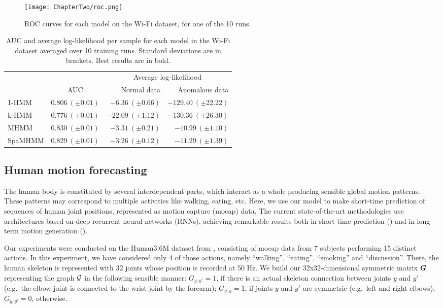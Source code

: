 \begin{figure}
    \centering
    \texttt{[image: ChapterTwo/roc.png]}
    \caption{ROC curves for each model on the Wi-Fi dataset, for one of the 10 runs.}
    \label{fig:spamhmm_wifi_roc}
\end{figure}

\begin{table}
    \centering
    \begin{tabular}{l|r|r r}
        \multicolumn{1}{c}{} & \multicolumn{1}{c}{} & \multicolumn{2}{|c}{Average log-likelihood} \\
        & \multicolumn{1}{c|}{AUC} & Normal data & Anomalous data \\
        \hline
        1-HMM & $0.806~(\pm 0.01)$ & $-6.36~(\pm 0.66)$ & $-129.40~(\pm 22.22)$ \\
        k-HMM & $0.776~(\pm 0.01)$ & $-22.09~(\pm 1.12)$ & $\mathbf{-130.36}~(\pm 26.30)$ \\
        MHMM & $\mathbf{0.830}~(\pm 0.01)$ & $-3.31~(\pm 0.21)$ & $-10.99~(\pm 1.10)$ \\
        SpaMHMM & $0.829~(\pm 0.01)$ & $\mathbf{-3.26}~(\pm 0.12)$ & $-11.29~(\pm 1.39)$ \\
    \end{tabular}
    \caption{AUC and average log-likelihood per sample for each model in the Wi-Fi dataset averaged over 10 training runs. Standard deviations are in brackets. Best results are in bold.}
    \label{tbl:spamhmm_wifi_results}
\end{table}

\subsection{Human motion forecasting}
\label{sec:h36m}
The human body is constituted by several interdependent parts, which interact as a whole producing sensible global motion patterns. These patterns may correspond to multiple activities like walking, eating, etc. Here, we use our model to make short-time prediction of sequences of human joint positions, represented as motion capture (mocap) data. The current state-of-the-art methodologies use architectures based on deep recurrent neural networks (RNNs), achieving remarkable results both in short-time prediction (\citet{Fragkiadaki2015, Martinez2017}) and in long-term motion generation (\citet{Jain2016, Pavllo2018}).

Our experiments were conducted on the Human3.6M dataset from \citet{Ionescu2011, Ionescu2014}, consisting of mocap data from 7 subjects performing 15 distinct actions. In this experiment, we have considered only 4 of those actions, namely ``walking'', ``eating'', ``smoking'' and ``discussion''. There, the human skeleton is represented with 32 joints whose position is recorded at 50 Hz. We build our 32x32-dimensional symmetric matrix ${\bm{G}}$ representing the graph ${\mathcal{G}}$ in the following sensible manner: $G_{y,y'}=1$, if there is an actual skeleton connection between joints $y$ and $y'$ (e.g.\  the elbow joint is connected to the wrist joint by the forearm); $G_{y,y}=1$, if joints $y$ and $y'$ are symmetric (e.g.\  left and right elbows); $G_{y,y'}=0$, otherwise.

